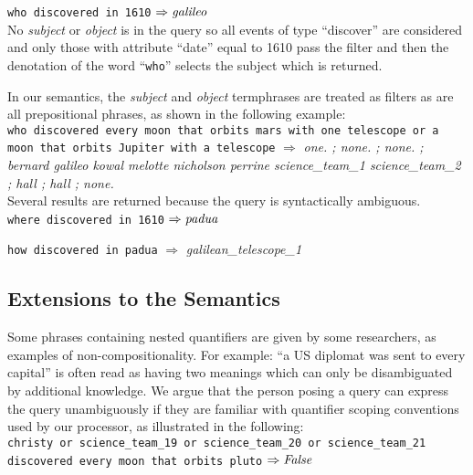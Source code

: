 \documentclass[../main.tex]{subfiles}
\begin{document}
\begin{refsection}
\noindent \texttt{who discovered in 1610} $\Rightarrow \operatorname{\mathit{galileo}}$ \\

No \textit{subject} or \textit{object} is in the query so all events of type ``discover'' are considered and only those with attribute ``date'' equal to 1610 pass the filter and then the denotation of the word ``\texttt{who}'' selects the subject which is returned.

In our semantics, the \textit{subject} and \textit{object} termphrases are treated as filters as are all prepositional phrases, as shown in the following example: \\

\noindent \texttt{who discovered every moon that orbits mars with one telescope or a \\ moon that orbits Jupiter with a telescope} $\Rightarrow$ \textit{one. ; none. ; none. ; bernard galileo kowal melotte nicholson perrine science\_team\_1 science\_team\_2 ; hall ; hall ; none.} \\

Several results are returned because the query is syntactically ambiguous. \\

\noindent \texttt{where discovered in 1610} $\Rightarrow \operatorname{\mathit{padua}}$

\noindent \texttt{how discovered in padua} $\Rightarrow$ \textit{galilean\_telescope\_1}

\subsection{Extensions to the Semantics}
\label{webist2019conf:extend}

Some phrases containing nested quantifiers are given by some researchers, as examples of non-compositionality. For example: ``a US diplomat was sent to every capital'' is often read as having two meanings which can only be disambiguated by additional knowledge. We argue that the person posing a query can express the query unambiguously if they are familiar with quantifier scoping conventions used by our processor, as illustrated in the following: \\

\noindent \texttt{christy or science\_team\_19 or science\_team\_20 or science\_team\_21 \\ discovered every moon that orbits pluto} $\Rightarrow \operatorname{\mathit{False}}$ \\


\end{refsection}
\end{document}
